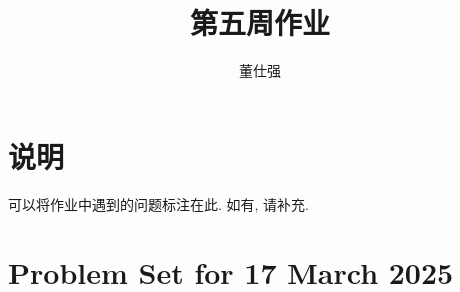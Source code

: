 \documentclass[11pt]{ctexart}
\title{第五周作业}
\author{董仕强}
\theoremstyle{definition}
\numberwithin{equation}{section}
\theoremstyle{definition}
\theoremstyle{remark}
\begin{document}
\maketitle

\section{说明}

可以将作业中遇到的问题标注在此. 如有, 请补充.

\tableofcontents

\newpage


\section{Problem Set for 17 March 2025}
\end{document}
